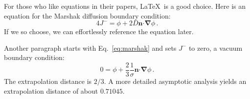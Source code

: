 \documentclass{anstrans}
\renewcommand{\vec}[1]{\bm{#1}} %
\newcommand{\vd}{\bm{\cdot}} %
\newcommand{\grad}{\vec{\nabla}} %
\begin{document}
For those who like equations in their papers, \LaTeX\ is a good choice. Here is
an equation for the Marshak diffusion boundary condition:
\begin{equation} \label{eq:marshak}
  4 J^- = \phi + 2 D \vec{n} \vd \grad \phi \,.
\end{equation}
If we so choose, we can effortlessly reference the equation later.

Another paragraph starts with Eq.~\eqref{eq:marshak} and sets $J^-$ to zero, a
vacuum boundary condition:
\begin{equation*}
  0 = \phi + \frac{2}{3} \frac{1}{\sigma} \vec{n} \vd \grad \phi \,.
\end{equation*}
The extrapolation distance is $2/3$. A more detailed asymptotic analysis yields
an extrapolation distance of about $0.71045$.



\end{document}
